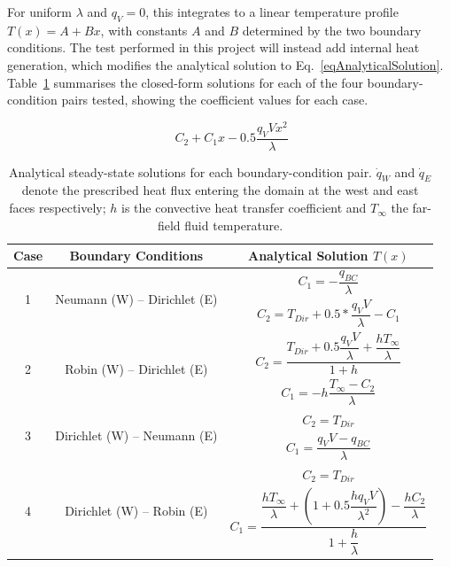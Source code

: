 For uniform $\lambda$ and $q_V = 0$, this integrates to a linear temperature profile $T(x) = A + Bx$, with constants $A$ and $B$ determined by the two boundary conditions. The test performed in this project will instead add internal heat generation, which modifies the analytical solution to Eq.~\eqref{eqAnalyticalSolution}. Table~\ref{tabDiff1DAnalytical} summarises the closed-form solutions for each of the four boundary-condition pairs tested, showing the coefficient values for each case.

\begin{equation}~\label{eqAnalyticalSolution}
    C_2 + C_1 x - 0.5 \dfrac{q_V V x^2}{\lambda}
\end{equation}

\begin{table}[ht]
    \centering
    \renewcommand{\arraystretch}{2.2}
    \begin{tabular}{|c|c|c|}
        \hline
        Case & Boundary Conditions & Analytical Solution $T(x)$ \\
        \hline
        \multirow{2}{*}{1} & \multirow{2}{*}{Neumann (W) -- Dirichlet (E)}
                           & $C_1 = - \dfrac{q_{BC}}{\lambda}$ \\
                           & & $C_2 = T_{Dir} + 0.5 * \dfrac{q_V V}{\lambda} - C_1$ \\
          \hline
        \multirow{2}{*}{2} & \multirow{2}{*}{Robin (W) -- Dirichlet (E)}
                           & $C_2 = \dfrac{T_{Dir} + 0.5 \dfrac{q_V V}{\lambda} + \dfrac{h T_{\infty}}{\lambda}}{1 + h}$ \\
                           & & $C_1 = - h \dfrac{T_{\infty} - C_2}{\lambda}$ \\
        \hline
        \multirow{2}{*}{3} & \multirow{2}{*}{Dirichlet (W) -- Neumann (E)}
                           & $C_2 = T_{Dir}$ \\
                           & & $C_1 = \dfrac{q_V V - q_{BC}}{\lambda}$ \\
        \hline
        \multirow{3}{*}{4} & \multirow{3}{*}{Dirichlet (W) -- Robin (E)}
                           & $C_2 = T_{Dir}$ \\
                           & & $C_1 = \dfrac{\dfrac{h T_{\infty}}{\lambda} + (1 + 0.5 \dfrac{h q_V V}{\lambda^2}) - \dfrac{h C_2}{\lambda}}{{1 + \dfrac{h}{\lambda}}}$ \\
        \hline
    \end{tabular}
    \caption{Analytical steady-state solutions for each boundary-condition pair. $\dot{q}_W$ and $\dot{q}_E$ denote the prescribed heat flux entering the domain at the west and east faces respectively; $h$ is the convective heat transfer coefficient and $T_\infty$ the far-field fluid temperature.}
    \label{tabDiff1DAnalytical}
\end{table}

